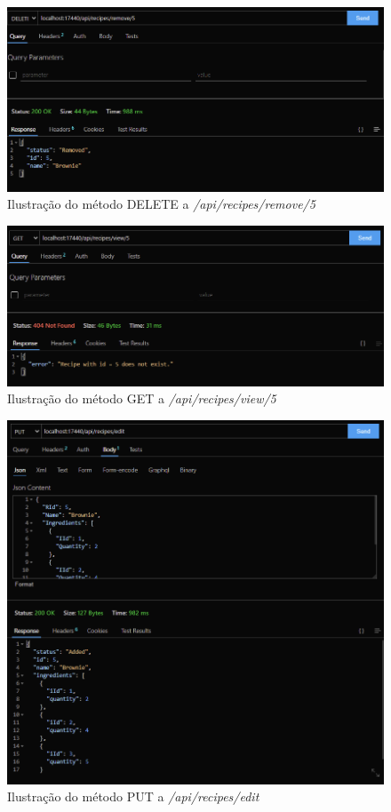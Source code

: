 \FloatBarrier
\begin{figure}[!hbt]
    \centering
    \includegraphics[width=14cm]{Resources/API/Recipes/Recipes (3).png}
    \caption{Ilustração do método DELETE a \textit{/api/recipes/remove/5}}
    
\end{figure}
\FloatBarrier
\begin{figure}[!hbt]
    \centering
    \includegraphics[width=14cm]{Resources/API/Recipes/Recipes (4).png}
    \caption{Ilustração do método GET a \textit{/api/recipes/view/5}}
    
\end{figure}
\FloatBarrier
\begin{figure}[!hbt]
    \centering
    \includegraphics[width=14cm]{Resources/API/Recipes/Recipes (5).png}
    \caption{Ilustração do método PUT a \textit{/api/recipes/edit}}
    
\end{figure}
